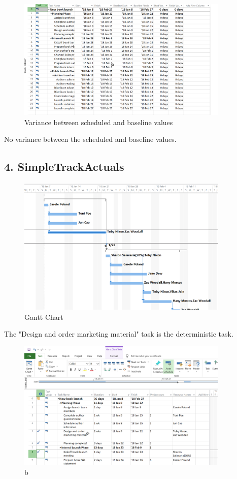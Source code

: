 \documentclass[runningheads]{llncs}
\begin{document}
\begin{figure}[H]
    \centering
    \includegraphics[width=0.9\textwidth]{./image/t2f2}
    \caption{Variance between scheduled and baseline values}
\end{figure}

No variance between the scheduled and baseline values.

\subsection*{4. SimpleTrackActuals}
\begin{figure}[H]
    \centering
    \includegraphics[width=0.9\textwidth]{./image/t3f1}
    \caption{Gantt Chart}
\end{figure}

The "Design and order marketing material" task is the deterministic task.

\begin{figure}[H]
    \centering
    \includegraphics[width=0.9\textwidth]{./image/t3f2}
    \caption{b}
\end{figure}
\end{document}
